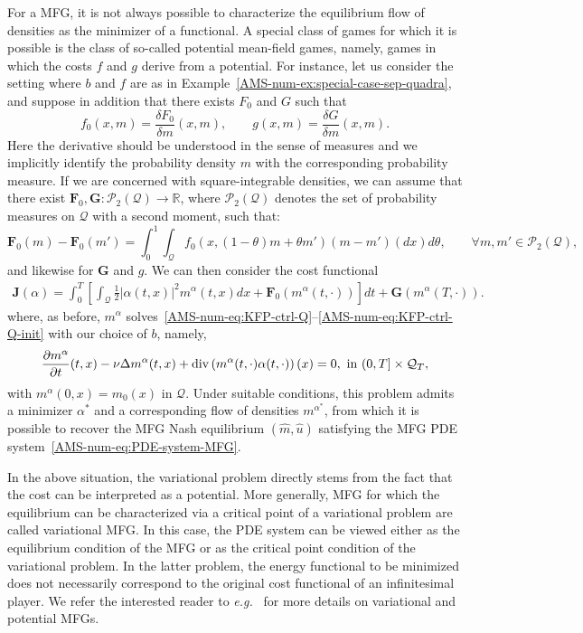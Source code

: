 \documentclass{amsproc}
\theoremstyle{definition}
\theoremstyle{remark}
\numberwithin{equation}{section}
\newcommand{\RR}{{\mathbb R}}
\newcommand{\bF}{{\mathbf F}}
\newcommand{\bG}{{\mathbf G}}
\newcommand{\bJ}{{\mathbf J}}
\newcommand{\cP}{{\mathcal P}}
\newcommand{\ctrl}{\alpha}
\newcommand{\dom}{\mathcal{Q}}
\newcommand{\domT}{\mathcal{Q}_{T}}
\newcommand{\diver}{\mathrm{div}}
\begin{document}
For a MFG, it is not always possible to characterize the equilibrium flow of densities as the minimizer of a functional. A special class of games for which it is possible is the class of so-called potential mean-field games, namely, games in which the costs $f$ and $g$ derive from a potential. For instance, let us consider the setting where $b$ and $f$ are as in Example~\ref{AMS-num-ex:special-case-sep-quadra}, and suppose in addition that there exists $F_0$ and $G$ such that
$$
	f_0(x,m) = \frac{\delta F_0}{\delta m}(x,m), 
	\qquad g (x,m) = \frac{\delta G}{\delta m}(x,m).
$$
Here the derivative should be understood in the sense of measures and we implicitly identify the probability density $m$ with the corresponding probability measure. If we are concerned with square-integrable densities, we can assume that there exist $\bF_0, \bG: \cP_2(\dom) \to \RR$, where $\cP_2(\dom)$ denotes the set of probability measures on $\dom$ with a second moment, such that:
$$
	\bF_0(m) - \bF_0(m') = \int_0^1 \int_{\dom} f_0(x, (1-\theta) m + \theta m') (m-m')(dx)  d\theta, \qquad \forall m,m' \in \cP_2(\dom),
$$ 
and likewise for $\bG$ and $g$. We can then consider the cost functional
\begin{align*}
	\bJ(\ctrl) = \int_0^T \left[ \int_{\dom} \frac{1}{2}|\ctrl(t,x)|^2 m^{\ctrl}(t,x) dx + \bF_0(m^{\ctrl}(t,\cdot)) \right]  dt + \bG(m^{\ctrl}(T,\cdot)). 
\end{align*}
where, as before, $m^{\ctrl}$ solves~\eqref{AMS-num-eq:KFP-ctrl-Q}--\eqref{AMS-num-eq:KFP-ctrl-Q-init} with our choice of $b$, namely,
\begin{equation*}
	\frac{\partial m^{\ctrl}}{\partial t}(t,x)  - \nu \Delta m^{\ctrl}(t,x) + \diver\left( m^{\ctrl}(t,\cdot) \ctrl(t,\cdot) \right)(x) = 0, 
	\hbox{ in } (0,T] \times \domT ,
\end{equation*}
with $m^{\ctrl}(0,x) = m_0(x)$ in $\dom$. Under suitable conditions, this problem admits a minimizer $\ctrl^*$ and a corresponding flow of densities $m^{\ctrl^*}$, from which it is possible to recover the MFG Nash equilibrium $(\hat m, \hat u)$ satisfying the MFG PDE system~\eqref{AMS-num-eq:PDE-system-MFG}. 

In the above situation, the variational problem directly stems from the fact that the cost can be interpreted as a potential. More generally, MFG for which the equilibrium can be characterized via a critical point of a variational problem are called variational MFG. In this case, the PDE system can be viewed either as the equilibrium condition of the MFG or as the critical point condition of the variational problem. In the latter problem, the energy functional to be minimized does not necessarily correspond to the original cost functional of an infinitesimal player. We refer the interested reader to \textit{e.g.}~\cite{Cardaliaguet-2013-notes,MR3644590} for more details on variational and potential MFGs.
\end{document}
